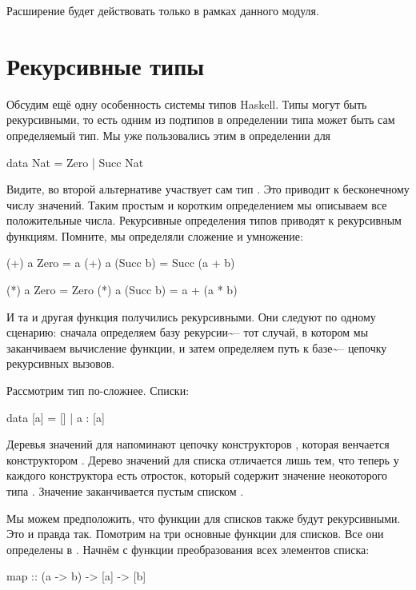 Расширение будет действовать только в рамках данного модуля.

\section{Рекурсивные типы}

Обсудим ещё одну особенность системы типов Haskell. Типы могут быть
рекурсивными, то есть одним из подтипов в определении типа может быть
сам определяемый тип. Мы уже пользовались этим в определении для


\begin{code}
data Nat = Zero | Succ Nat
\end{code}

Видите, во второй альтернативе участвует сам тип . Это приводит
к бесконечному числу значений. Таким простым и коротким определением мы
описываем все положительные числа. Рекурсивные определения типов
приводят к рекурсивным функциям. Помните, мы определяли сложение и
умножение:


\begin{code}
(+) a Zero     = a
(+) a (Succ b) = Succ (a + b)

(*) a Zero     = Zero
(*) a (Succ b) = a + (a * b)   
\end{code}

И та и другая функция получились рекурсивными. Они следуют по одному
сценарию: сначала определяем базу рекурсии\textasciitilde{}-- тот
случай, в котором мы заканчиваем вычисление функции, и затем определяем
путь к базе\textasciitilde{}-- цепочку рекурсивных вызовов.

Рассмотрим тип по-сложнее. Списки:


\begin{code}
data [a] = [] | a : [a]
\end{code}

Деревья значений для  напоминают цепочку конструкторов
, которая венчается конструктором . Дерево значений
для списка отличается лишь тем, что теперь у каждого конструктора
 есть отросток, который содержит значение неокоторого типа
. Значение заканчивается пустым списком \In{[]}.

Мы можем предположить, что функции для списков также будут рекурсивными.
Это и правда так. Помотрим на три основные функции для списков. Все они
определены в . Начнём с функции преобразования всех
элементов списка:


\begin{code}
map :: (a -> b) -> [a] -> [b]
\end{code}

